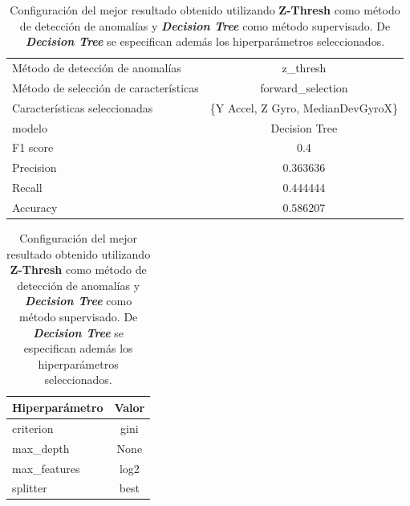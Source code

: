 \begin{appendices}
		\begin{table}[htb]
			\centering
			\caption{Configuración del mejor resultado obtenido utilizando \textbf{Z-Thresh} como método de detección de anomalías y \textbf{\emph{Decision Tree}}
			como método supervisado. De \textbf{\emph{Decision Tree}} se especifican además los hiperparámetros seleccionados.}
			\label{table:21}
			\begin{tabular}{lc}
				\toprule
					  Método de detección de anomalías &                          z\_thresh \\
				Método de selección de características &                 forward\_selection \\
						 Características seleccionadas & \{Y Accel, Z Gyro, MedianDevGyroX\} \\
												modelo &                     Decision Tree \\
											  F1 score &                               0.4 \\
											 Precision &                          0.363636 \\
												Recall &                          0.444444 \\
											  Accuracy &                          0.586207 \\
				\bottomrule
				\end{tabular}
			\newline
			\newline

			\begin{tabular}{lc}
				\toprule
				Hiperparámetro & Valor \\
				\midrule
					 criterion &  gini \\
					 max\_depth &  None \\
				  max\_features &  log2 \\
					  splitter &  best \\
				\bottomrule
			\end{tabular}
			
		\end{table}


\end{appendices}
